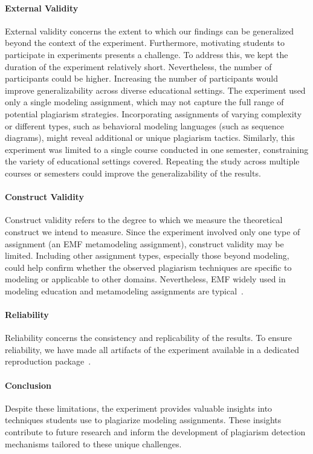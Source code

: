 \paragraph{External Validity}
External validity concerns the extent to which our findings can be generalized beyond the context of the experiment.
%
Furthermore, motivating students to participate in experiments presents a challenge. To address this, we kept the duration of the experiment relatively short. Nevertheless, the number of participants could be higher. Increasing the number of participants would improve generalizability across diverse educational settings.
%
The experiment used only a single modeling assignment, which may not capture the full range of potential plagiarism strategies. Incorporating assignments of varying complexity or different types, such as behavioral modeling languages (such as sequence diagrams), might reveal additional or unique plagiarism tactics.
%
Similarly, this experiment was limited to a single course conducted in one semester, constraining the variety of educational settings covered. Repeating the study across multiple courses or semesters could improve the generalizability of the results.
%
\paragraph{Construct Validity}
Construct validity refers to the degree to which we measure the theoretical construct we intend to measure.
%
Since the experiment involved only one type of assignment (an \ac{EMF} metamodeling assignment), construct validity may be limited. Including other assignment types, especially those beyond modeling, could help confirm whether the observed plagiarism techniques are specific to modeling or applicable to other domains. Nevertheless, \ac{EMF} widely used in modeling education and metamodeling assignments are typical~\cite{Ciccozzi2018}.
%
\paragraph{Reliability}
Reliability concerns the consistency and replicability of the results.
To ensure reliability, we have made all artifacts of the experiment available in a dedicated reproduction package~\cite{Saglam2023_supp}.
%
\paragraph{Conclusion}
Despite these limitations, the experiment provides valuable insights into techniques students use to plagiarize modeling assignments. These insights contribute to future research and inform the development of plagiarism detection mechanisms tailored to these unique challenges.
